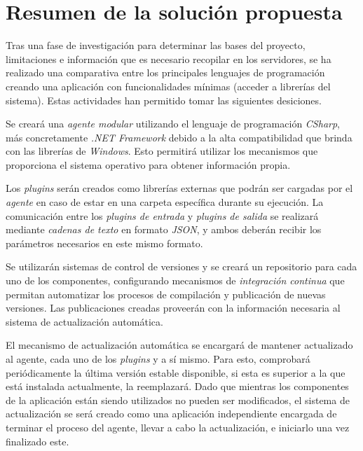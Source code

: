 \section{Resumen de la solución propuesta} \label{sec:sol}

    Tras una fase de investigación para determinar las bases del proyecto, limitaciones e información que es necesario recopilar en los servidores, se ha realizado una comparativa entre los principales lenguajes de programación creando una aplicación con funcionalidades mínimas (acceder a librerías del sistema). Estas actividades han permitido tomar las siguientes desiciones.
    
    Se creará una \textit{agente modular} utilizando el lenguaje de programación \textit{CSharp}, más concretamente \textit{.NET Framework} debido a la alta compatibilidad que brinda con las librerías de \textit{Windows}. Esto permitirá utilizar los mecanismos que proporciona el sistema operativo para obtener información propia.
    
    Los \textit{plugins} serán creados como librerías externas que podrán ser cargadas por el \textit{agente} en caso de estar en una carpeta específica durante su ejecución. La comunicación entre los \textit{plugins de entrada} y \textit{plugins de salida} se realizará mediante \textit{cadenas de texto} en formato \textit{JSON}, y ambos deberán recibir los parámetros necesarios en este mismo formato.
    
    Se utilizarán sistemas de control de versiones y se creará un repositorio para cada uno de los componentes, configurando mecanismos de \textit{integración continua} que permitan automatizar los procesos de compilación y publicación de nuevas versiones. Las publicaciones creadas proveerán con la información necesaria al sistema de actualización automática.
    
    El mecanismo de actualización automática se encargará de mantener actualizado al agente, cada uno de los \textit{plugins} y a sí mismo. Para esto, comprobará periódicamente la última versión estable disponible, si esta es superior a la que está instalada actualmente, la reemplazará. Dado que mientras los componentes de la aplicación están siendo utilizados no pueden ser modificados, el sistema de actualización se será creado como una aplicación independiente encargada de terminar el proceso del agente, llevar a cabo la actualización, e iniciarlo una vez finalizado este.
    
